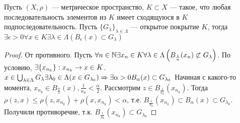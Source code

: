 \begin{lemma}
    Пусть \((X, \rho)\) --- метрическое пространство, \(K \subset X\) --- такое, что любая последовательность элементов из \(K\) имеет сходящуюся в \(K\) подпоследовательность. Пусть \(\{G_\lambda\}_{\lambda \in \Lambda}\) --- открытое покрытие \(K\), тогда \(\exists \epsilon > 0 \forall x \in K \exists \lambda \in \Lambda (B_\epsilon(x) \subset G_\lambda)\)
\end{lemma}
\begin{proof}
    От противного. Пусть \(\forall n \in \mathbb{N} \exists x_n \in K \forall \lambda \in \Lambda \left(B_{\frac{1}{n}}(x_n) \not\subset G_\lambda\right)\). По условию, \(\exists \{x_{n_k}\}: x_{n_k} \rightarrow x \in K\). \(x \in \bigcup_{\lambda \in \Lambda} G_\lambda \exists \lambda_0 \in \Lambda (x \in G_{\lambda_0}) \Rightarrow \exists \alpha > 0 B_{\alpha}(x) \subset G_{\lambda_0}\)
    Начиная с какого-то момента, \(x_{n_k} \in B_{\frac{\alpha}{2}}(x), \frac{1}{n_k} < \frac{\alpha}{2}\). Рассмотрим \(z \in B_{\frac{1}{n_k}}(x_{n_k})\). Тогда \(\rho(z, x) \le \rho(z, x_{n_k}) + \rho(x, x_{n_k}) < \alpha\), т.е. \(B_{\frac{1}{n_k}}(x_{n_k}) \subset B_\alpha(x) \subset G_{\lambda_0}\). Получили противоречие, т.к. \(B_{\frac{1}{n_k}}(x_{n_k}) \subset G_{\lambda_0}\)
\end{proof}


